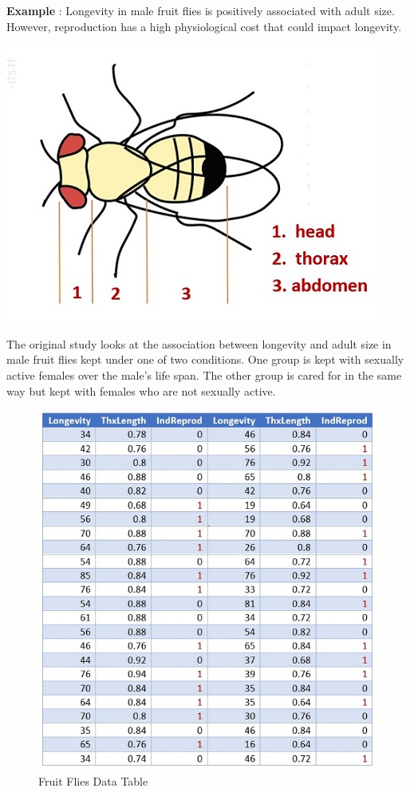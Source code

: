 \documentclass[
]{book}
\begin{document}
\textbf{Example }: Longevity in male fruit flies is positively associated with adult size. However, reproduction has a high physiological cost that could impact longevity.

\begin{center}\includegraphics[width=0.8\linewidth]{img11/w11-FruitFliesImage} \end{center}

The original study looks at the association between longevity and adult size in male fruit flies kept under one of two conditions. One group is kept with sexually active females over the male's life span. The other group is cared for in the same way but kept with females who are not sexually active.

\begin{figure}

{\centering \includegraphics[width=0.8\linewidth]{img11/w11-FruitFlies} 

}

\caption{Fruit Flies Data Table}\label{fig:unnamed-chunk-171}
\end{figure}
\end{document}

